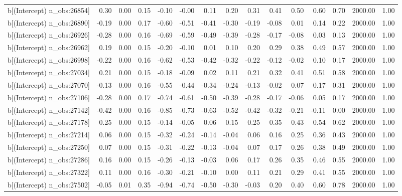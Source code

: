 \begin{table}[ht]
\begin{tabular}{rrrrrrrrrrrrrrr}
  b[(Intercept) n\_obs:26854] & 0.30 & 0.00 & 0.15 & -0.10 & -0.00 & 0.11 & 0.20 & 0.31 & 0.41 & 0.50 & 0.60 & 0.70 & 2000.00 & 1.00 \\ 
  b[(Intercept) n\_obs:26890] & -0.19 & 0.00 & 0.17 & -0.60 & -0.51 & -0.41 & -0.30 & -0.19 & -0.08 & 0.01 & 0.14 & 0.22 & 2000.00 & 1.00 \\ 
  b[(Intercept) n\_obs:26926] & -0.28 & 0.00 & 0.16 & -0.69 & -0.59 & -0.49 & -0.39 & -0.28 & -0.17 & -0.08 & 0.03 & 0.13 & 2000.00 & 1.00 \\ 
  b[(Intercept) n\_obs:26962] & 0.19 & 0.00 & 0.15 & -0.20 & -0.10 & 0.01 & 0.10 & 0.20 & 0.29 & 0.38 & 0.49 & 0.57 & 2000.00 & 1.00 \\ 
  b[(Intercept) n\_obs:26998] & -0.22 & 0.00 & 0.16 & -0.62 & -0.53 & -0.42 & -0.32 & -0.22 & -0.12 & -0.02 & 0.10 & 0.17 & 2000.00 & 1.00 \\ 
  b[(Intercept) n\_obs:27034] & 0.21 & 0.00 & 0.15 & -0.18 & -0.09 & 0.02 & 0.11 & 0.21 & 0.32 & 0.41 & 0.51 & 0.58 & 2000.00 & 1.00 \\ 
  b[(Intercept) n\_obs:27070] & -0.13 & 0.00 & 0.16 & -0.55 & -0.44 & -0.34 & -0.24 & -0.13 & -0.02 & 0.07 & 0.17 & 0.31 & 2000.00 & 1.00 \\ 
  b[(Intercept) n\_obs:27106] & -0.28 & 0.00 & 0.17 & -0.74 & -0.61 & -0.50 & -0.39 & -0.28 & -0.17 & -0.06 & 0.05 & 0.17 & 2000.00 & 1.00 \\ 
  b[(Intercept) n\_obs:27142] & -0.42 & 0.00 & 0.16 & -0.85 & -0.73 & -0.63 & -0.52 & -0.42 & -0.32 & -0.21 & -0.11 & 0.00 & 2000.00 & 1.00 \\ 
  b[(Intercept) n\_obs:27178] & 0.25 & 0.00 & 0.15 & -0.14 & -0.05 & 0.06 & 0.15 & 0.25 & 0.35 & 0.43 & 0.54 & 0.62 & 2000.00 & 1.00 \\ 
  b[(Intercept) n\_obs:27214] & 0.06 & 0.00 & 0.15 & -0.32 & -0.24 & -0.14 & -0.04 & 0.06 & 0.16 & 0.25 & 0.36 & 0.43 & 2000.00 & 1.00 \\ 
  b[(Intercept) n\_obs:27250] & 0.07 & 0.00 & 0.15 & -0.31 & -0.22 & -0.13 & -0.04 & 0.07 & 0.17 & 0.26 & 0.38 & 0.49 & 2000.00 & 1.00 \\ 
  b[(Intercept) n\_obs:27286] & 0.16 & 0.00 & 0.15 & -0.26 & -0.13 & -0.03 & 0.06 & 0.17 & 0.26 & 0.35 & 0.46 & 0.55 & 2000.00 & 1.00 \\ 
  b[(Intercept) n\_obs:27322] & 0.11 & 0.00 & 0.16 & -0.30 & -0.21 & -0.10 & 0.00 & 0.11 & 0.21 & 0.29 & 0.41 & 0.55 & 2000.00 & 1.00 \\ 
  b[(Intercept) n\_obs:27502] & -0.05 & 0.01 & 0.35 & -0.94 & -0.74 & -0.50 & -0.30 & -0.03 & 0.20 & 0.40 & 0.60 & 0.78 & 2000.00 & 1.00 \\ 

\end{tabular}
\end{table}
